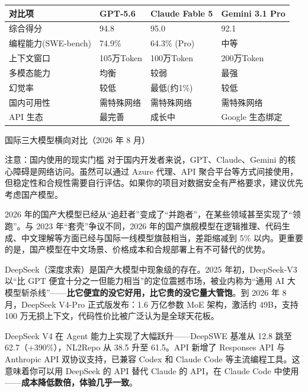 \begin{center}
\begin{tabularx}{\linewidth}{|X|X|X|X|}
\hline
\textbf{对比项} & \textbf{GPT-5.6} & \textbf{Claude Fable 5} & \textbf{Gemini 3.1 Pro} \tabularnewline
\hline
综合得分 & 94.8 & 95.0 & 92.1 \tabularnewline
编程能力(SWE-bench) & 74.9\% & 64.3\% (Pro) & 中等 \tabularnewline
上下文窗口 & 105万Token & 100万Token & 200万Token \tabularnewline
多模态能力 & 均衡 & 较弱 & 最强 \tabularnewline
幻觉率 & 较低 & 最低(约1\%) & 较低 \tabularnewline
国内可用性 & 需特殊网络 & 需特殊网络 & 需特殊网络 \tabularnewline
API 生态 & 最完善 & 成长中 & Google 生态绑定 \tabularnewline
\hline
\end{tabularx}
\end{center}

\begin{center}\small\color{gray}国际三大模型横向对比（2026 年 8 月）\end{center}

\begin{tcbwarn}{注意：国内使用的现实门槛}
对于国内开发者来说，GPT、Claude、Gemini 的核心障碍是网络访问。虽然可以通过 Azure 代理、API 聚合平台等方式间接使用，但稳定性和合规性需要自行评估。如果你的项目对数据安全有严格要求，建议优先考虑国产模型。

\end{tcbwarn}


2026 年的国产大模型已经从“追赶者”变成了“并跑者”，在某些领域甚至实现了“领跑”。与 2023 年“套壳”争议不同，2026 年的国产旗舰模型在逻辑推理、代码生成、中文理解等方面已经与国际一线模型旗鼓相当，差距缩减到 5\% 以内。更重要的是，国产模型在中文场景、价格成本和合规部署上有不可替代的优势。


DeepSeek（深度求索）是国产大模型中现象级的存在。2025 年初，DeepSeek-V3 以“比 GPT 便宜十分之一但能力相当”的定位震撼市场，被业内称为“通用 AI 大模型斩杀线”——\textbf{比它便宜的没它好用，比它贵的没它量大管饱}。到 2026 年 8 月，DeepSeek V4-Pro 正式版发布：1.6 万亿参数 MoE 架构，激活约 49B，支持 100 万无损上下文，代码性价比被广泛认为是全球天花板。

DeepSeek V4 在 Agent 能力上实现了大幅跃升——DeepSWE 基准从 12.8 跳至 62.7（+390\%），NL2Repo 从 38.5 升至 61.5。API 新增了 Responses API 与 Anthropic API 双协议支持，已兼容 Codex 和 Claude Code 等主流编程工具。这意味着你可以用 DeepSeek 的 API 替代 Claude 的 API，在 Claude Code 中使用——\textbf{成本降低数倍，体验几乎一致}。

